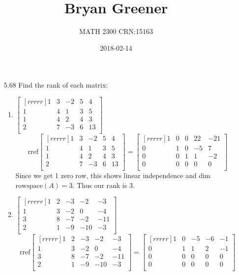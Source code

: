 \documentclass[12pt]{article}
\title{Bryan Greener}
\author{MATH 2300 CRN:15163}
\date{2018-02-14}
\begin{document}
\maketitle

\TabPositions{4cm}

\begin{enumerate}
\item[5.68] Find the rank of each matrix:
	\begin{enumerate}
	\item $\begin{bmatrix}[rrrrr]1&3&-2&5&4\\1&4&1&3&5\\1&4&2&4&3\\2&7&-3&6&13\\\end{bmatrix}$
	\[ \mathrm{rref}\begin{bmatrix}[rrrrr]1&3&-2&5&4\\1&4&1&3&5\\1&4&2&4&3\\2&7&-3&6&13\\\end{bmatrix} = \begin{bmatrix}[rrrrr]1&0&0&22&-21\\0&1&0&-5&7\\0&0&1&1&-2\\0&0&0&0&0\\\end{bmatrix} \]
	Since we get 1 zero row, this shows linear independence and dim $\mathrm{rowspace}(A)=3$. Thus our rank is 3.
	\item $\begin{bmatrix}[rrrrr]1&2&-3&-2&-3\\1&3&-2&0&-4\\3&8&-7&-2&-11\\2&1&-9&-10&-3\\\end{bmatrix}$
	\[ \mathrm{rref}\begin{bmatrix}[rrrrr]1&2&-3&-2&-3\\1&3&-2&0&-4\\3&8&-7&-2&-11\\2&1&-9&-10&-3\\\end{bmatrix} = \begin{bmatrix}[rrrrr]1&0&-5&-6&-1\\0&1&1&2&-1\\0&0&0&0&0\\0&0&0&0&0\\\end{bmatrix} \]

\end{enumerate}
\end{enumerate}
\end{document}
